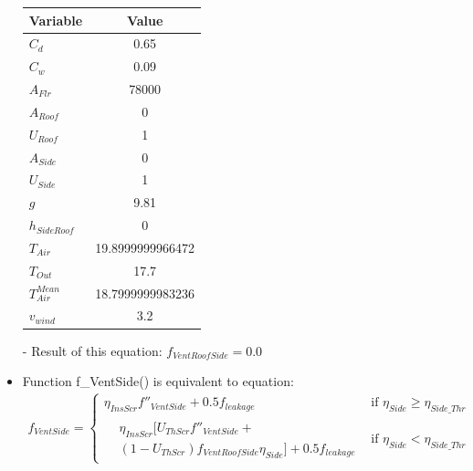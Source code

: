 \documentclass[a4paper]{article}
\begin{document}
\begin{itemize}
        \begin{table}[H]
          \centering
          \begin{tabular}{@{}lS[table-format=5.13]@{}}
            \toprule
            \textbf{Variable}  & \textbf{Value}   \\
            \midrule
            \(C_d\)            & 0.65             \\
            \(C_w\)            & 0.09             \\
            \(A_{Flr}\)        & 78000            \\
            \(A_{Roof}\)       & 0                \\
            \(U_{Roof}\)       & 1                \\
            \(A_{Side}\)       & 0                \\
            \(U_{Side}\)       & 1                \\
            \(g\)              & 9.81             \\
            \(h_{SideRoof}\)   & 0                \\
            \(T_{Air}\)        & 19.8999999966472 \\
            \(T_{Out}\)        & 17.7             \\
            \(T_{Air}^{Mean}\) & 18.7999999983236 \\
            \(v_{wind}\)       & 3.2              \\
            \bottomrule
          \end{tabular}
        \end{table}

  \item[-] Result of this equation: \(f_{VentRoofSide} = 0.0\)

  \item Function f\_VentSide() is equivalent to equation:
        \begin{gather*}
          f_{VentSide} =
          \begin{cases}
            \eta_{InsScr} f''_{VentSide} + 0.5f_{leakage} & \text{if~} \eta_{Side} \geq \eta_{Side\_Thr} \\
            \begin{split}
              & \eta_{InsScr} [U_{ThScr}f''_{VentSide} + \\
              & (1-U_{ThScr})f_{VentRoofSide} \eta_{Side}] + 0.5 f_{leakage}
            \end{split}                   & \text{if~} \eta_{Side} < \eta_{Side\_Thr}
          \end{cases}
        \end{gather*}


\end{itemize}
\end{document}
